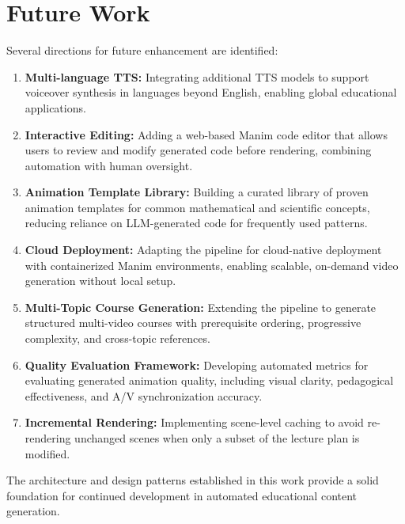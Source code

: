 \documentclass[12pt,a4paper,twoside,openright]{report}
\begin{document}
\section{Future Work}

Several directions for future enhancement are identified:

\begin{enumerate}
  \item \textbf{Multi-language TTS:} Integrating additional TTS models to support voiceover synthesis in languages beyond English, enabling global educational applications.
  \item \textbf{Interactive Editing:} Adding a web-based Manim code editor that allows users to review and modify generated code before rendering, combining automation with human oversight.
  \item \textbf{Animation Template Library:} Building a curated library of proven animation templates for common mathematical and scientific concepts, reducing reliance on LLM-generated code for frequently used patterns.
  \item \textbf{Cloud Deployment:} Adapting the pipeline for cloud-native deployment with containerized Manim environments, enabling scalable, on-demand video generation without local setup.
  \item \textbf{Multi-Topic Course Generation:} Extending the pipeline to generate structured multi-video courses with prerequisite ordering, progressive complexity, and cross-topic references.
  \item \textbf{Quality Evaluation Framework:} Developing automated metrics for evaluating generated animation quality, including visual clarity, pedagogical effectiveness, and A/V synchronization accuracy.
  \item \textbf{Incremental Rendering:} Implementing scene-level caching to avoid re-rendering unchanged scenes when only a subset of the lecture plan is modified.
\end{enumerate}

The architecture and design patterns established in this work provide a solid foundation for continued development in automated educational content generation.

\cleardoublepage
\end{document}
